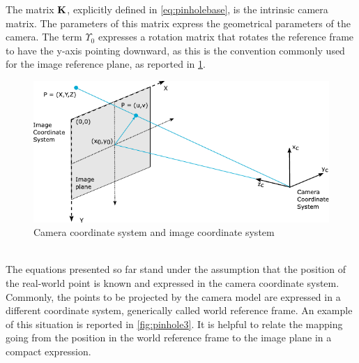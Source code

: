 The matrix $\mathrm{\textbf{K}}$, explicitly defined in \cref{eq:pinholebase}, is the intrinsic camera matrix. The parameters of this matrix express the geometrical parameters of the camera. The term $\Upsilon_0$ expresses a rotation matrix that rotates the reference frame to have the y-axis pointing downward, as this is the convention commonly used for the image reference plane, as reported in \cref{fig:pinhole2}.
\begin{figure}[!ht]
    \centering
    \includegraphics[width = 0.75\linewidth]{Images/pinhole1.pdf}
    \caption{Camera coordinate system and image coordinate system}
    \label{fig:pinhole2}
\end{figure}
\\The equations presented so far stand under the assumption that the position of the real-world point is known and expressed in the camera coordinate system. Commonly, the points to be projected by the camera model are expressed in a different coordinate system, generically called world reference frame. An example of this situation is reported in \cref{fig:pinhole3}. It is helpful to relate the mapping going from the position in the world reference frame to the image plane in a compact expression. \\

